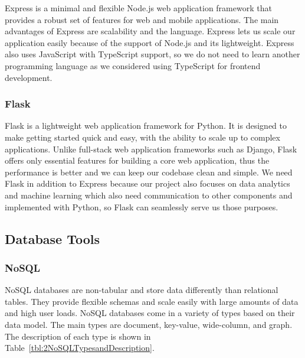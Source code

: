 \documentclass[12pt,oneside,openright,a4paper]{cpe-english-project}
\begin{document}
Express is a minimal and flexible Node.js web application framework that provides a robust set of features for web and mobile applications. \cite{Express} The main advantages of Express are scalability and the language. Express lets us scale our application easily because of the support of Node.js and its lightweight. Express also uses JavaScript with TypeScript support, so we do not need to learn another programming language as we considered using TypeScript for frontend development.

\subsubsection{Flask}

Flask is a lightweight web application framework for Python. It is designed to make getting started quick and easy, with the ability to scale up to complex applications. \cite{Flask} Unlike full-stack web application frameworks such as Django, Flask offers only essential features for building a core web application, thus the performance is better and we can keep our codebase clean and simple. We need Flask in addition to Express because our project also focuses on data analytics and machine learning which also need communication to other components and implemented with Python, so Flask can seamlessly serve us those purposes.

\subsection{Database Tools}

\subsubsection{NoSQL}

NoSQL databases are non-tabular and store data differently than relational tables. They provide flexible schemas and scale easily with large amounts of data and high user loads. NoSQL databases come in a variety of types based on their data model. The main types are document, key-value, wide-column, and graph. \cite{WhatisNoSQL} The description of each type is shown in Table~\ref{tbl:2NoSQLTypesandDescription}.
\end{document}
